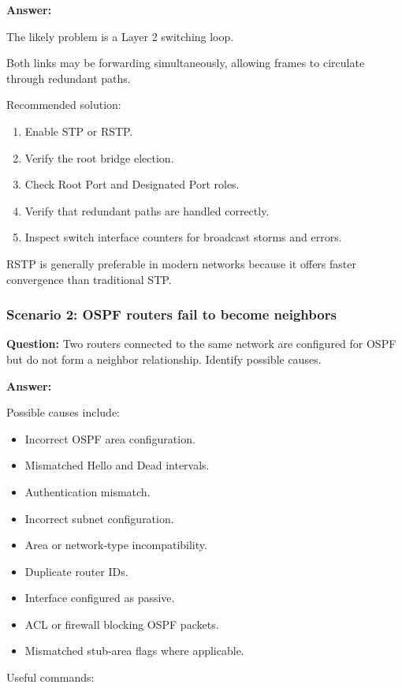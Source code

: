 \textbf{Answer:}

The likely problem is a Layer 2 switching loop.

Both links may be forwarding simultaneously, allowing frames to circulate through redundant paths.

Recommended solution:

\begin{enumerate}
\item Enable STP or RSTP.
\item Verify the root bridge election.
\item Check Root Port and Designated Port roles.
\item Verify that redundant paths are handled correctly.
\item Inspect switch interface counters for broadcast storms and errors.
\end{enumerate}

RSTP is generally preferable in modern networks because it offers faster convergence than traditional STP.

\subsubsection*{Scenario 2: OSPF routers fail to become neighbors}

\textbf{Question:} Two routers connected to the same network are configured for OSPF but do not form a neighbor relationship. Identify possible causes.

\textbf{Answer:}

Possible causes include:

\begin{itemize}
\item Incorrect OSPF area configuration.
\item Mismatched Hello and Dead intervals.
\item Authentication mismatch.
\item Incorrect subnet configuration.
\item Area or network-type incompatibility.
\item Duplicate router IDs.
\item Interface configured as passive.
\item ACL or firewall blocking OSPF packets.
\item Mismatched stub-area flags where applicable.
\end{itemize}

Useful commands:


